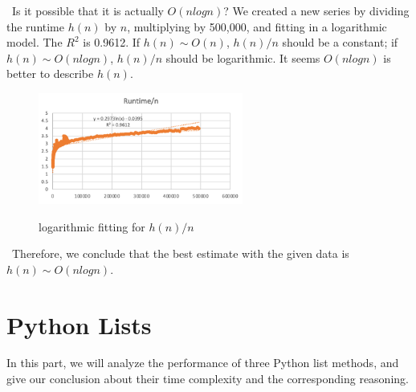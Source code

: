 \documentclass[12pt]{article}
\begin{document}
\newpage ~\newline\noindent Is it possible that it is actually $O(nlogn)$? We created a new series by dividing the runtime $h(n)$ by $n$, multiplying by 500,000, and fitting in a logarithmic model. The $R^2$ is 0.9612. If $h(n) \sim O(n)$, $h(n)/n$ should be a constant; if $h(n) \sim O(nlogn)$, $h(n)/n$ should be logarithmic. It seems $O(nlogn)$ is better to describe $h(n)$.

\begin{figure}[h!]
\centering
\includegraphics[width=0.6\textwidth,height=\textheight,keepaspectratio]{hn_2.png}
\label{Figure: hn_2}
\caption{logarithmic fitting for \(h(n)/n\)}
\end{figure}

~\newline\noindent Therefore, we conclude that the best estimate with the given data is $h(n) \sim O(nlogn)$.



\section{Python Lists}
In this part, we will analyze the performance of three Python list methods, and give our conclusion about their time complexity and the corresponding reasoning.
\end{document}
